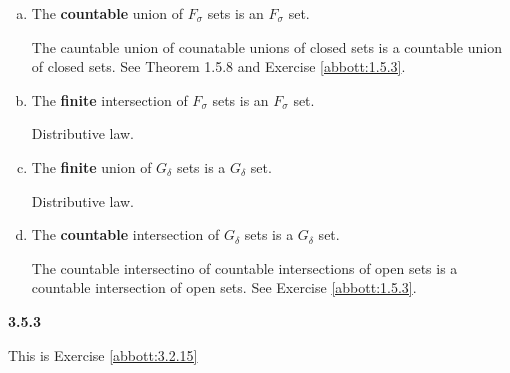 \begin{enumerate}[(a)]
\item The \textbf{countable} union of $F_\sigma$ sets is an $F_\sigma$ set.

The cauntable union of counatable unions of closed sets is a countable union of closed sets.
See Theorem 1.5.8 and Exercise \ref{abbott:1.5.3}.

\item The \textbf{finite} intersection of $F_\sigma$ sets is an $F_\sigma$ set.

Distributive law.

\item The \textbf{finite} union of $G_\delta$ sets is a $G_\delta$ set.

Distributive law.

\item The \textbf{countable} intersection of $G_\delta$ sets is a $G_\delta$ set.

The countable intersectino of countable intersections of open sets is a countable intersection of open sets.
See Exercise \ref{abbott:1.5.3}.

\end{enumerate}



\textbf{3.5.3}

This is Exercise \ref{abbott:3.2.15}